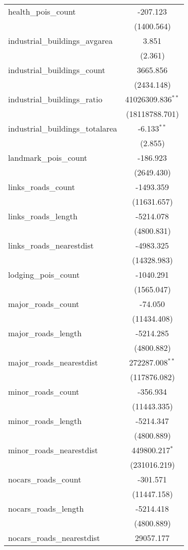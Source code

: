 \begin{table}[!htbp]
\begin{tabular}{@{\extracolsep{5pt}}lc}
 health_pois_count & -207.123$^{}$ \\
  & (1400.564) \\
 industrial_buildings_avgarea & 3.851$^{}$ \\
  & (2.361) \\
 industrial_buildings_count & 3665.856$^{}$ \\
  & (2434.148) \\
 industrial_buildings_ratio & 41026309.836$^{**}$ \\
  & (18118788.701) \\
 industrial_buildings_totalarea & -6.133$^{**}$ \\
  & (2.855) \\
 landmark_pois_count & -186.923$^{}$ \\
  & (2649.430) \\
 links_roads_count & -1493.359$^{}$ \\
  & (11631.657) \\
 links_roads_length & -5214.078$^{}$ \\
  & (4800.831) \\
 links_roads_nearestdist & -4983.325$^{}$ \\
  & (14328.983) \\
 lodging_pois_count & -1040.291$^{}$ \\
  & (1565.047) \\
 major_roads_count & -74.050$^{}$ \\
  & (11434.408) \\
 major_roads_length & -5214.285$^{}$ \\
  & (4800.882) \\
 major_roads_nearestdist & 272287.008$^{**}$ \\
  & (117876.082) \\
 minor_roads_count & -356.934$^{}$ \\
  & (11443.335) \\
 minor_roads_length & -5214.347$^{}$ \\
  & (4800.889) \\
 minor_roads_nearestdist & 449800.217$^{*}$ \\
  & (231016.219) \\
 nocars_roads_count & -301.571$^{}$ \\
  & (11447.158) \\
 nocars_roads_length & -5214.418$^{}$ \\
  & (4800.889) \\
 nocars_roads_nearestdist & 29057.177$^{}$ \\

\end{tabular}
\end{table}
